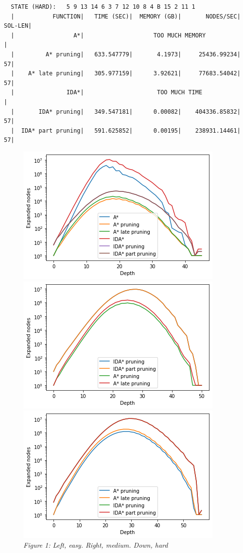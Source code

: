 \documentclass[a4paper,10pt]{article}
\begin{document}
  \begin{verbatim}  
  STATE (HARD):   5 9 13 14 6 3 7 12 10 8 4 B 15 2 11 1                                                                                     
  |           FUNCTION|   TIME (SEC)|  MEMORY (GB)|       NODES/SEC|    SOL-LEN|
  |                 A*|                    TOO MUCH MEMORY                     |  
  |         A* pruning|   633.547779|       4.1973|     25436.99234|         57|
  |    A* late pruning|   305.977159|      3.92621|     77683.54042|         57|
  |               IDA*|                     TOO MUCH TIME                      |
  |       IDA* pruning|   349.547181|      0.00082|    404336.85832|         57|
  |  IDA* part pruning|   591.625852|      0.00195|    238931.14461|         57|
    \end{verbatim}

  \begin{figure}[h!]
    \centering
    \includegraphics[scale=0.6]{15puzzle_easy.png}
    \includegraphics[scale=0.6]{15puzzle_medium.png}
    \includegraphics[scale=0.6]{15puzzle_hard.png}
    \\
    \small{\textit{Figure 1: Left, easy. Right, medium. Down, hard}}
  \end{figure}  
\end{document}
